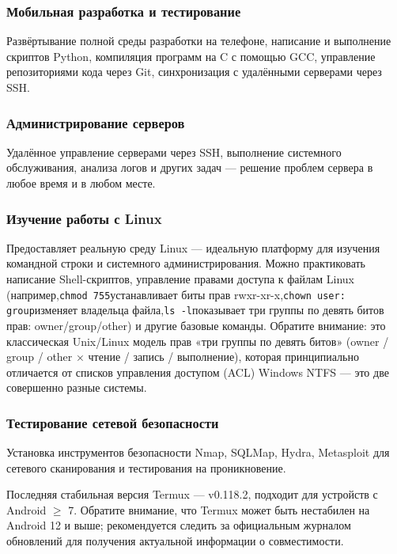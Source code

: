 \subsubsection*{Мобильная разработка и тестирование}

Развёртывание полной среды разработки на телефоне, написание и выполнение скриптов Python, компиляция программ на C с помощью GCC, управление репозиториями кода через Git, синхронизация с удалёнными серверами через SSH.

\subsubsection*{Администрирование серверов}

Удалённое управление серверами через SSH, выполнение системного обслуживания, анализа логов и других задач — решение проблем сервера в любое время и в любом месте.

\subsubsection*{Изучение работы с Linux}

Предоставляет реальную среду Linux — идеальную платформу для изучения командной строки и системного администрирования. Можно практиковать написание Shell-скриптов, управление правами доступа к файлам Linux (например,\texttt{chmod 755}устанавливает биты прав rwxr-xr-x,\texttt{chown user: group}изменяет владельца файла,\texttt{ls -\allowbreak l}показывает три группы по девять битов прав: owner/group/other) и другие базовые команды. Обратите внимание: это классическая Unix/Linux модель прав «три группы по девять битов» (owner / group / other × чтение / запись / выполнение), которая принципиально отличается от списков управления доступом (ACL) Windows NTFS — это две совершенно разные системы.

\subsubsection*{Тестирование сетевой безопасности}

Установка инструментов безопасности Nmap, SQLMap, Hydra, Metasploit для сетевого сканирования и тестирования на проникновение.


Последняя стабильная версия Termux — v0.118.2, подходит для устройств с Android $\geq$ 7. Обратите внимание, что Termux может быть нестабилен на Android 12 и выше; рекомендуется следить за официальным журналом обновлений для получения актуальной информации о совместимости.

